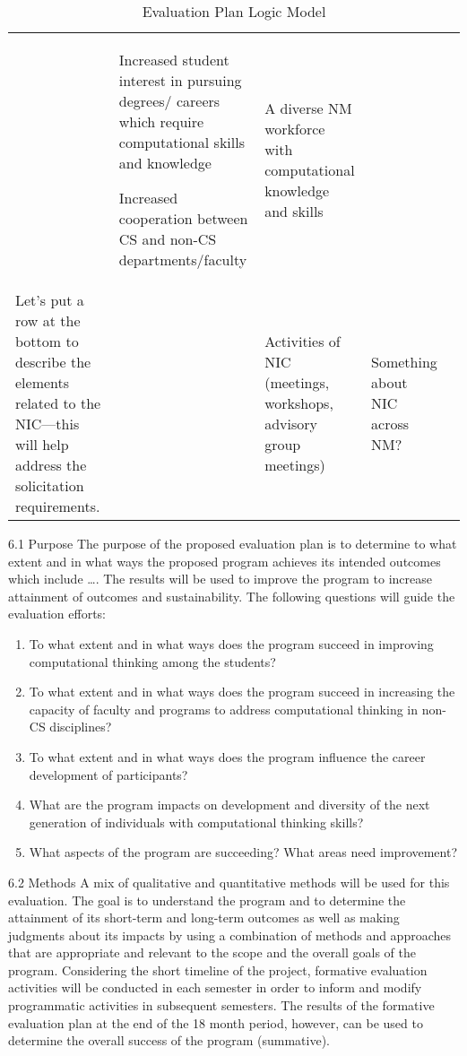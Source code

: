 \begin{table}[hp!]
\begin{tabular}{|p{1in}|p{1in}|p{1in}|p{1in}|p{1in}|}
    & 
    Increased student interest in pursuing degrees/ careers which require computational skills and knowledge  

    \vspace{0.25in}
    Increased cooperation between CS and non-CS departments/faculty

    & 
    A diverse NM workforce with computational knowledge and skills \\
    
    Let’s put a row at the bottom to describe the elements related to the NIC—this will help address the solicitation requirements.
    &
    &
    Activities of NIC (meetings, workshops, advisory group meetings)
    &
    Something about NIC across NM?
    &
    \\
\hline
\end{tabular}
\caption{Evaluation Plan Logic Model}
\label{tab:logic-model}
\end{table}

6.1 Purpose
The purpose of the proposed evaluation plan is to determine to what extent and in what ways the proposed program achieves its intended outcomes which include …. The results will be used to improve the program to increase attainment of outcomes and sustainability. The following questions will guide the evaluation efforts: 
\begin{enumerate}
\item To what extent and in what ways does the program succeed in improving computational thinking among the students? 
\item To what extent and in what ways does the program succeed in increasing the capacity of faculty and programs to address computational thinking in non-CS disciplines? 
\item To what extent and in what ways does the program influence the career development of participants?
\item What are the program impacts on development and diversity of the next generation of individuals with computational thinking skills?
\item What aspects of the program are succeeding? What areas need improvement? 
\end{enumerate}

6.2 Methods
A mix of qualitative and quantitative methods will be used for this evaluation. The goal is to understand the program and to determine the attainment of its short-term and long-term outcomes as well as making judgments about its impacts by using a combination of methods and approaches that are appropriate and relevant to the scope and the overall goals of the program.    
Considering the short timeline of the project, formative evaluation activities will be conducted in each semester in order to inform and modify programmatic activities in subsequent semesters. The results of the formative evaluation plan at the end of the 18 month period, however, can be used to determine the overall success of the program (summative). 

